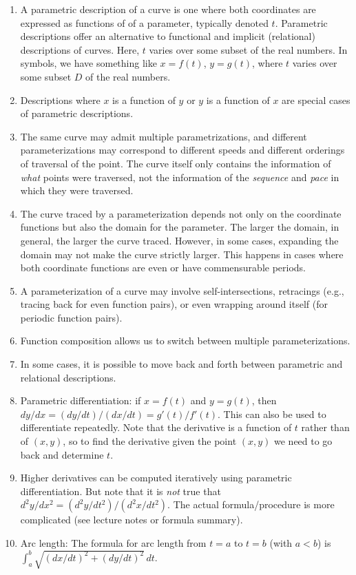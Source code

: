 \documentclass[10pt]{amsart}
\begin{document}
\begin{enumerate}
\item A parametric description of a curve is one where both
  coordinates are expressed as functions of of a parameter, typically
  denoted $t$. Parametric descriptions offer an alternative to
  functional and implicit (relational) descriptions of curves. Here,
  $t$ varies over some subset of the real numbers. In symbols, we have
  something like $x = f(t)$, $y = g(t)$, where $t$ varies over some
  subset $D$ of the real numbers.
\item Descriptions where $x$ is a function of $y$ or $y$ is a function
  of $x$ are special cases of parametric descriptions.
\item The same curve may admit multiple parametrizations, and
  different parameterizations may correspond to different speeds and
  different orderings of traversal of the point. The curve itself only
  contains the information of {\em what} points were traversed, not
  the information of the {\em sequence} and {\em pace} in which they
  were traversed.
\item The curve traced by a parameterization depends not only on the
  coordinate functions but also the domain for the parameter. The
  larger the domain, in general, the larger the curve traced. However,
  in some cases, expanding the domain may not make the curve strictly
  larger. This happens in cases where both coordinate functions are
  even or have commensurable periods.
\item A parameterization of a curve may involve self-intersections,
  retracings (e.g., tracing back for even function pairs), or even
  wrapping around itself (for periodic function pairs).
\item Function composition allows us to switch between multiple
  parameterizations.
\item In some cases, it is possible to move back and forth between
  parametric and relational descriptions.
\item Parametric differentiation: if $x = f(t)$ and $y = g(t)$, then
  $dy/dx = (dy/dt)/(dx/dt) = g'(t)/f'(t)$. This can also be used to
  differentiate repeatedly. Note that the derivative is a function of
  $t$ rather than of $(x,y)$, so to find the derivative given the
  point $(x,y)$ we need to go back and determine $t$.
\item Higher derivatives can be computed iteratively using parametric
  differentiation. But note that it is {\em not} true that $d^2y/dx^2
  = (d^2y/dt^2)/(d^2x/dt^2)$. The actual formula/procedure is more
  complicated (see lecture notes or formula summary).
\item Arc length: The formula for arc length from $t = a$ to $t = b$
  (with $a < b$) is $\int_a^b \sqrt{(dx/dt)^2 + (dy/dt)^2} \, dt$.
\end{enumerate}
\end{document}
